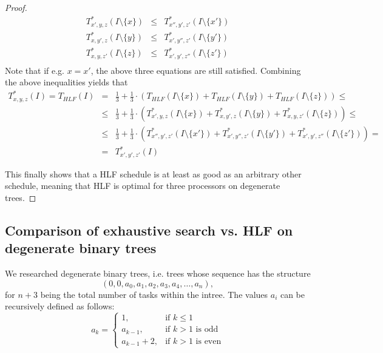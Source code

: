 \begin{proof}
  \begin{eqnarray*}
    T^*_{x',y,z}(I\setminus\{x\})
    & \leq &
    T^*_{x'',y',z'}(I\setminus\{x'\}) \\
    T^*_{x,y',z}(I\setminus\{y\})
    & \leq &
    T^*_{x',y'',z'}(I\setminus\{y'\}) \\
    T^*_{x,y,z'}(I\setminus\{z\})
    & \leq &
    T^*_{x',y',z''}(I\setminus\{z'\}) \\
  \end{eqnarray*}
  Note that if e.g. $x=x'$, the above three equations are still satisfied.
  Combining the above inequalities yields that
  \begin{eqnarray*}
    T^*_{x,y,z}(I) = T_{HLF}(I)
    & = &
    \frac{1}{3} + \frac{1}{3} \cdot 
    \left( 
      T_{HLF}(I\setminus\{x\}) +
      T_{HLF}(I\setminus\{y\}) +
      T_{HLF}(I\setminus\{z\})
    \right) 
    \leq \\
    & \leq & 
    \frac{1}{3} + \frac{1}{3} \cdot 
    \left( 
      T^*_{x',y,z}(I\setminus\{x\}) +
      T^*_{x,y',z}(I\setminus\{y\}) +
      T^*_{x,y,z'}(I\setminus\{z\})
    \right) 
    \leq \\
    & \leq &
    \frac{1}{3} + \frac{1}{3} \cdot 
    \left( 
      T^*_{x'',y',z'}(I\setminus\{x'\}) +
      T^*_{x',y'',z'}(I\setminus\{y'\}) +
      T^*_{x',y',z''}(I\setminus\{z'\})
    \right) = \\
    & = &
    T^*_{x',y',z'}(I)
  \end{eqnarray*}

  This finally shows that a HLF schedule is at least as good as an arbitrary other schedule, meaning that HLF is optimal for three processors on degenerate trees.
\end{proof}

\subsection{Comparison of exhaustive search vs. HLF on degenerate binary trees}
\label{sec:p3-degenerate-trees-binary}

We researched degenerate binary trees, i.e. trees whose sequence has the structure
\begin{equation*}
  \left( 0,0,a_0,a_1,a_2,a_3,a_4,\dots,a_n \right),
\end{equation*}
for $n+3$ being the total number of tasks within the intree. The values $a_i$ can be recursively defined as follows:
\begin{equation*}
  a_k =
  \begin{cases}
    1, & \text{if } k\leq 1 \\
    a_{k-1}, & \text{if } k>1 \text{ is odd} \\
    a_{k-1}+2, & \text{if } k>1 \text{ is even}
  \end{cases}
\end{equation*}

